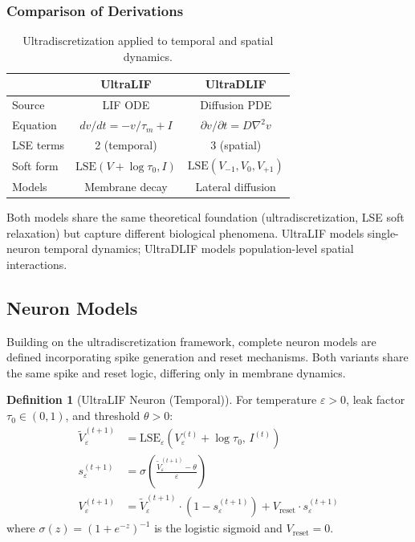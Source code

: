 \documentclass{article}
\theoremstyle{plain}
\theoremstyle{definition}
\newtheorem{definition}[theorem]{Definition}
\theoremstyle{remark}
\newcommand{\lse}{\mathrm{LSE}}
\newcommand{\eps}{\varepsilon}
\begin{document}
\subsubsection{Comparison of Derivations}

\begin{table}[h]
\centering
\begin{small}
\begin{tabular}{lcc}
\toprule
& \textbf{UltraLIF} & \textbf{UltraDLIF} \\
\midrule
Source & LIF ODE & Diffusion PDE \\
Equation & $dv/dt = -v/\tau_m + I$ & $\partial v/\partial t = D\nabla^2 v$ \\
LSE terms & 2 (temporal) & 3 (spatial) \\
Soft form & $\lse(V{+}\log\tau_0, I)$ & $\lse(V_{-1}, V_0, V_{+1})$ \\
Models & Membrane decay & Lateral diffusion \\
\bottomrule
\end{tabular}
\end{small}
\caption{Ultradiscretization applied to temporal and spatial dynamics.}
\label{tab:derivations}
\end{table}

Both models share the same theoretical foundation (ultradiscretization, LSE soft relaxation) but capture different biological phenomena. UltraLIF models single-neuron temporal dynamics; UltraDLIF models population-level spatial interactions.

\subsection{Neuron Models}
\label{sec:neuron_models}

Building on the ultradiscretization framework, complete neuron models are defined incorporating spike generation and reset mechanisms. Both variants share the same spike and reset logic, differing only in membrane dynamics.

\begin{definition}[UltraLIF Neuron (Temporal)]
\label{def:ultralif}
For temperature $\eps > 0$, leak factor $\tau_0 \in (0,1)$, and threshold $\theta > 0$:
\begin{align}
\tilde{V}_\eps^{(t+1)} &= \lse_\eps\left(V_\eps^{(t)} + \log\tau_0, \, I^{(t)}\right) \label{eq:ultralif_voltage}\\
s_\eps^{(t+1)} &= \sigma\left(\frac{\tilde{V}_\eps^{(t+1)} - \theta}{\eps}\right) \label{eq:ultralif_spike}\\
V_\eps^{(t+1)} &= \tilde{V}_\eps^{(t+1)} \cdot (1 - s_\eps^{(t+1)}) + V_\text{reset} \cdot s_\eps^{(t+1)} \label{eq:ultralif_reset}
\end{align}
where $\sigma(z) = (1 + e^{-z})^{-1}$ is the logistic sigmoid and $V_\text{reset} = 0$.
\end{definition}
\end{document}
